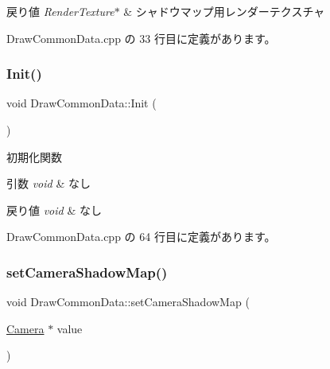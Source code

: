 \begin{DoxyRetVals}{戻り値}
{\em Render\+Texture$\ast$} & シャドウマップ用レンダーテクスチャ \\
\hline
\end{DoxyRetVals}


 Draw\+Common\+Data.\+cpp の 33 行目に定義があります。

\mbox{\label{class_draw_common_data_ac111688b8426f23dd97b3fd31284fcb3}} 
\subsubsection{\texorpdfstring{Init()}{Init()}}
{\footnotesize\ttfamily void Draw\+Common\+Data\+::\+Init (\begin{DoxyParamCaption}{ }\end{DoxyParamCaption})}



初期化関数 


\begin{DoxyParams}{引数}
{\em void} & なし \\
\hline
\end{DoxyParams}

\begin{DoxyRetVals}{戻り値}
{\em void} & なし \\
\hline
\end{DoxyRetVals}


 Draw\+Common\+Data.\+cpp の 64 行目に定義があります。

\mbox{\label{class_draw_common_data_adc69a051e339523a6f0c5e1826694458}} 
\subsubsection{\texorpdfstring{set\+Camera\+Shadow\+Map()}{setCameraShadowMap()}}
{\footnotesize\ttfamily void Draw\+Common\+Data\+::set\+Camera\+Shadow\+Map (\begin{DoxyParamCaption}\item[{\mbox{\hyperlink{class_camera}{Camera}} $\ast$}]{value }\end{DoxyParamCaption})}



